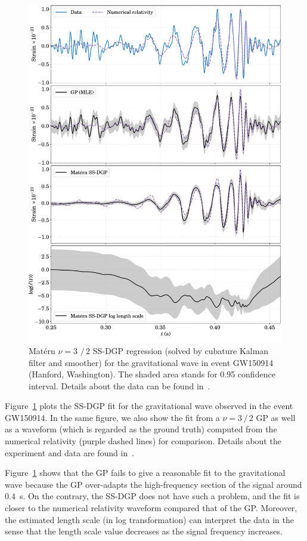 \begin{figure}[t!]
	\centering
	\includegraphics[width=.99\linewidth]{figs/gravit-wave-ssdgp}
	\caption{Mat\'{e}rn $\nu=3\, \, /\, 2$ SS-DGP regression (solved by cubature Kalman filter and smoother) for the gravitational wave in event GW150914 (Hanford, Washington). The shaded area stands for 0.95 confidence interval. Details about the data can be found in~\citet{Zhao2020SSDGP}.}
	\label{fig:gravit-wave-ssdgp}
\end{figure}

Figure~\ref{fig:gravit-wave-ssdgp} plots the SS-DGP fit for the gravitational wave observed in the event GW150914. In the same figure, we also show the fit from a \matern $\nu=3\,/\,2$ GP as well as a waveform (which is regarded as the ground truth) computed from the numerical relativity (purple dashed lines) for comparison. Details about the experiment and data are found in~\citet{Zhao2020SSDGP}.

Figure~\ref{fig:gravit-wave-ssdgp} shows that the GP fails to give a reasonable fit to the gravitational wave because the GP over-adapts the high-frequency section of the signal around $0.4$~s. On the contrary, the SS-DGP does not have such a problem, and the fit is closer to the numerical relativity waveform compared that of the GP. Moreover, the estimated length scale (in log transformation) can interpret the data in the sense that the length scale value decreases as the signal frequency increases. 

